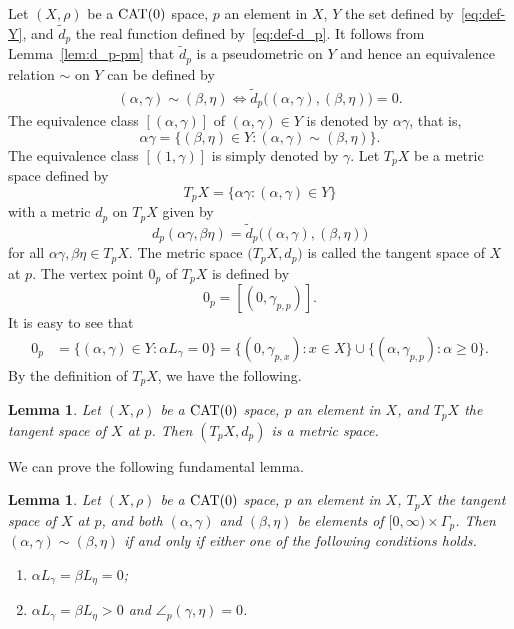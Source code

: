\documentclass[draft]{amsart}
\numberwithin{equation}{section}
\newcommand{\CAT}{\textup{CAT}}
\theoremstyle{plain}
\newtheorem{lemma}[theorem]{Lemma}
\theoremstyle{definition}
\theoremstyle{remark}
\begin{document}
Let $(X, \rho)$ be a $\CAT(0)$ space, 
$p$ an element in $X$, $Y$ the set defined by~\eqref{eq:def-Y}, 
and $\tilde{d}_p$ the real function defined 
by~\eqref{eq:def-d_p}. 
It follows from Lemma~\ref{lem:d_p-pm} that 
$\tilde{d}_p$ is a pseudometric on $Y$ 
and hence an equivalence relation $\sim$ on $Y$ 
can be defined by 
\begin{align}\label{eq:def-sim}
 (\alpha, \gamma)\sim (\beta, \eta) 
 \Longleftrightarrow 
 \tilde{d}_p\bigl( (\alpha, \gamma), (\beta, \eta) \bigr) =0.  
\end{align}
The equivalence class $[(\alpha, \gamma)]$ of $(\alpha, \gamma) \in Y$ 
is denoted by $\alpha \gamma$, that is, 
\[
 \alpha \gamma 
 = \bigl\{(\beta, \eta)\in Y: 
 (\alpha, \gamma)\sim (\beta, \eta)\bigr\}. 
\]
The equivalence class $[(1, \gamma)]$ is simply denoted by $\gamma$. 
Let $T_p X$ be a metric space defined by 
\[
 T_pX = \bigl\{\alpha \gamma: (\alpha, \gamma) \in Y\bigr\} 
\]
with a metric $d_p$ on $T_pX$ given by 
\[
 d_p(\alpha \gamma, \beta \eta) 
 = \tilde{d}_p\bigl((\alpha, \gamma), (\beta, \eta)\bigr)
\]
for all $\alpha \gamma, \beta \eta \in T_p X$. 
The metric space $\bigl(T_pX, d_p\bigr)$ is 
called the tangent space of $X$ at $p$. 
The vertex point $0_p$ of $T_pX$ is defined by 
\[
 0_p = [(0, \gamma_{p,p})]. 
\]
It is easy to see that 
\begin{align*}
 0_p 
 &= \bigl\{(\alpha, \gamma)\in Y: \alpha L_{\gamma}=0\bigr\} 
 = \bigl\{(0, \gamma_{p, x}): x\in X\bigr\} 
 \cup \bigl\{(\alpha, \gamma_{p, p}): \alpha \geq 0\bigr\}. 
\end{align*}
By the definition of $T_pX$, we have the following. 
\begin{lemma}
 Let $(X, \rho)$ be a $\CAT(0)$ space, $p$ an element in $X$, 
 and $T_pX$ the tangent space of $X$ at $p$. 
 Then $(T_pX, d_p)$ is a metric space. 
\end{lemma}

We can prove the following fundamental lemma. 
\begin{lemma}\label{lem:character-equiv-Y}
 Let $(X, \rho)$ be a $\CAT(0)$ space, $p$ an element in $X$, 
 $T_pX$ the tangent space of $X$ at $p$, 
 and both $(\alpha, \gamma)$ and $(\beta, \eta)$ 
 be elements of $[0,\infty) \times \Gamma_p$. 
 Then $(\alpha, \gamma)\sim (\beta, \eta)$ if and only if 
 either one of the following conditions holds. 
 \begin{enumerate}
  \item[(i)]$\alpha L_{\gamma}=\beta L_{\eta}=0$; 
  \item[(ii)] $\alpha L_{\gamma}=\beta L_{\eta}>0$ and $\angle_p(\gamma, \eta)=0$. 
 \end{enumerate}
\end{lemma}
\end{document}

